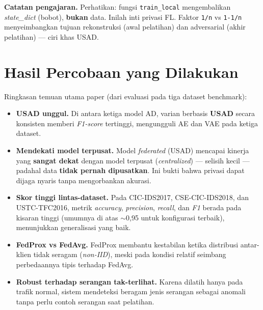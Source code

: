 \documentclass[11pt,a4paper]{article}
\begin{document}
\noindent\textbf{Catatan pengajaran.} Perhatikan: fungsi \texttt{train\_local}
mengembalikan \emph{state\_dict} (bobot), \textbf{bukan} data. Inilah inti
privasi FL. Faktor \texttt{1/n} vs \texttt{1-1/n} menyeimbangkan tujuan
rekonstruksi (awal pelatihan) dan adversarial (akhir pelatihan) --- ciri khas
USAD.

\section{Hasil Percobaan yang Dilakukan}

Ringkasan temuan utama paper (dari evaluasi pada tiga dataset benchmark):

\begin{itemize}[leftmargin=1.4em]
  \item \textbf{USAD unggul.} Di antara ketiga model AD, varian berbasis
  \textbf{USAD} secara konsisten memberi \emph{F1-score} tertinggi, mengungguli
  AE dan VAE pada ketiga dataset.
  \item \textbf{Mendekati model terpusat.} Model \emph{federated} (USAD) mencapai
  kinerja yang \textbf{sangat dekat} dengan model terpusat (\emph{centralized})
  --- selisih kecil --- padahal data \textbf{tidak pernah dipusatkan}. Ini bukti
  bahwa privasi dapat dijaga nyaris tanpa mengorbankan akurasi.
  \item \textbf{Skor tinggi lintas-dataset.} Pada CIC-IDS2017, CSE-CIC-IDS2018,
  dan USTC-TFC2016, metrik \emph{accuracy}, \emph{precision}, \emph{recall}, dan
  \emph{F1} berada pada kisaran tinggi (umumnya di atas $\sim$0,95 untuk
  konfigurasi terbaik), menunjukkan generalisasi yang baik.
  \item \textbf{FedProx vs FedAvg.} FedProx membantu kestabilan ketika distribusi
  antar-klien tidak seragam (\emph{non-IID}), meski pada kondisi relatif seimbang
  perbedaannya tipis terhadap FedAvg.
  \item \textbf{Robust terhadap serangan tak-terlihat.} Karena dilatih hanya pada
  trafik normal, sistem mendeteksi beragam jenis serangan sebagai anomali tanpa
  perlu contoh serangan saat pelatihan.
\end{itemize}
\end{document}
